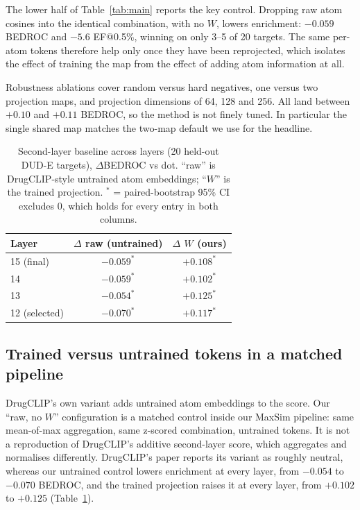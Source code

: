 \documentclass[10pt,letterpaper,twocolumn]{article}
\begin{document}
The lower half of Table~\ref{tab:main} reports the key control. Dropping raw atom cosines into the identical combination, with no $W$, lowers enrichment: $-0.059$ BEDROC and $-5.6$ EF@0.5\%, winning on only 3--5 of 20 targets. The same per-atom tokens therefore help only once they have been reprojected, which isolates the effect of training the map from the effect of adding atom information at all.

Robustness ablations cover random versus hard negatives, one versus two projection maps, and projection dimensions of 64, 128 and 256. All land between $+0.10$ and $+0.11$ BEDROC, so the method is not finely tuned. In particular the single shared map matches the two-map default we use for the headline.

\begin{table}[t]
\centering
\small
\caption{Second-layer baseline across layers (20 held-out DUD-E targets), $\Delta$BEDROC vs dot. ``raw'' is DrugCLIP-style untrained atom embeddings; ``$W$'' is the trained projection. $^{*}$ = paired-bootstrap 95\% CI excludes 0, which holds for every entry in both columns.}
\label{tab:layers}
\begin{tabular}{@{}lcc@{}}
\toprule
Layer & $\Delta$ raw (untrained) & $\Delta$ $W$ (ours) \\
\midrule
15 (final) & $-0.059^{*}$ & $+0.108^{*}$ \\
14 & $-0.059^{*}$ & $+0.102^{*}$ \\
13 & $-0.054^{*}$ & $+0.125^{*}$ \\
12 (selected) & $-0.070^{*}$ & $+0.117^{*}$ \\
\bottomrule
\end{tabular}
\end{table}

\subsection{Trained versus untrained tokens in a matched pipeline}

DrugCLIP's own variant adds untrained atom embeddings to the score. Our ``raw, no $W$'' configuration is a matched control inside our MaxSim pipeline: same mean-of-max aggregation, same z-scored combination, untrained tokens. It is not a reproduction of DrugCLIP's additive second-layer score, which aggregates and normalises differently. DrugCLIP's paper reports its variant as roughly neutral, whereas our untrained control lowers enrichment at every layer, from $-0.054$ to $-0.070$ BEDROC, and the trained projection raises it at every layer, from $+0.102$ to $+0.125$ (Table~\ref{tab:layers}).
\end{document}

